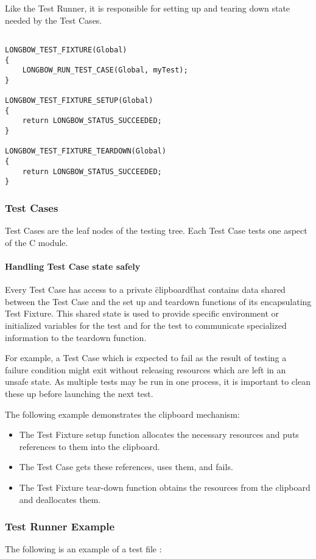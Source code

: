 Like the Test Runner, it is responsible for setting up and tearing down state needed by the Test Cases.   

\begin{lstlisting}
 
LONGBOW_TEST_FIXTURE(Global)
{
    LONGBOW_RUN_TEST_CASE(Global, myTest);
}

LONGBOW_TEST_FIXTURE_SETUP(Global)
{
    return LONGBOW_STATUS_SUCCEEDED;
}

LONGBOW_TEST_FIXTURE_TEARDOWN(Global)
{
    return LONGBOW_STATUS_SUCCEEDED;
}
\end{lstlisting}

\subsubsection{Test Cases}
Test Cases are the leaf nodes of the testing tree.  Each Test Case tests one aspect of the C module.

\paragraph {Handling Test Case state safely}

Every Test Case has access to a private \"clipboard\" that contains data shared between the Test Case and the set up and teardown functions of its encapsulating Test Fixture.
This shared state is used to provide specific environment or initialized variables for the test and for the test to communicate specialized information to the teardown function.

For example, a Test Case which is expected to fail as the result of testing a failure condition might exit without releasing resources which are left in an unsafe state.
As multiple tests may be run in one process, it is important to clean these up before launching the next test.

The following example demonstrates the clipboard mechanism: 
\begin{itemize}
\item{The Test Fixture setup function allocates the necessary resources and puts references to them into the clipboard.}
\item{The Test Case gets these references, uses them, and fails.} 
\item{The Test Fixture tear-down function obtains the resources from the clipboard and deallocates them.}
\end{itemize}

\subsubsection {Test Runner Example}
The following is an example of a test file :

